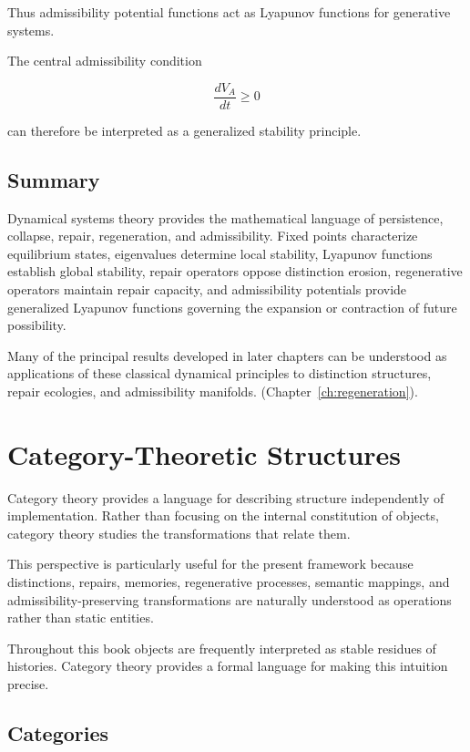 \documentclass[12pt,twoside,openright]{book}
\begin{document}
Thus admissibility potential functions act as Lyapunov
functions for generative systems.

The central admissibility condition

\[
\frac{dV_A}{dt}\ge0
\]

can therefore be interpreted as a generalized stability
principle.

\subsection{Summary}

Dynamical systems theory provides the mathematical
language of persistence, collapse, repair, regeneration,
and admissibility. Fixed points characterize equilibrium
states, eigenvalues determine local stability, Lyapunov
functions establish global stability, repair operators
oppose distinction erosion, regenerative operators
maintain repair capacity, and admissibility potentials
provide generalized Lyapunov functions governing the
expansion or contraction of future possibility.

Many of the principal results developed in later chapters
can be understood as applications of these classical
dynamical principles to distinction structures, repair
ecologies, and admissibility manifolds.
(Chapter~\ref{ch:regeneration}).

\section{Category-Theoretic Structures}

Category theory provides a language for describing
structure independently of implementation. Rather than
focusing on the internal constitution of objects, category
theory studies the transformations that relate them.

This perspective is particularly useful for the present
framework because distinctions, repairs, memories,
regenerative processes, semantic mappings, and
admissibility-preserving transformations are naturally
understood as operations rather than static entities.

Throughout this book objects are frequently interpreted as
stable residues of histories. Category theory provides a
formal language for making this intuition precise.

\subsection{Categories}
\end{document}
